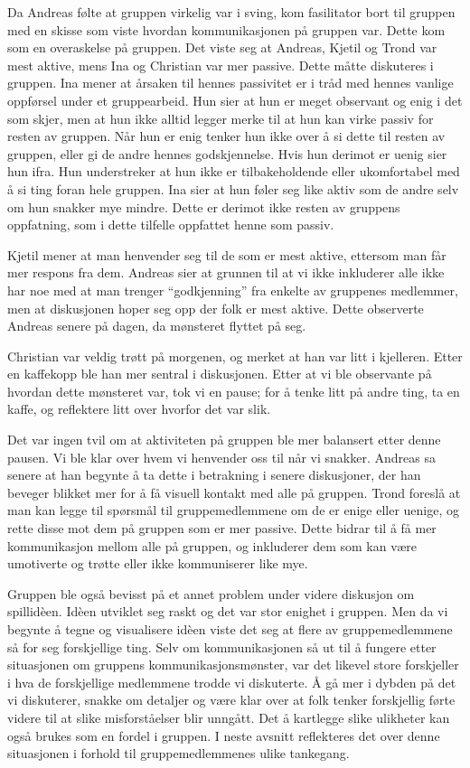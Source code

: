Da Andreas følte at gruppen virkelig var i sving, kom fasilitator bort
til gruppen med en skisse som viste hvordan kommunikasjonen på gruppen
var.
Dette kom som en overaskelse på gruppen. Det viste seg at Andreas,
Kjetil og Trond var mest aktive, mens Ina og Christian var mer passive.
Dette måtte diskuteres i gruppen.  Ina mener at årsaken til hennes
passivitet er i tråd med hennes vanlige oppførsel under et gruppearbeid.
Hun sier at hun er meget observant og enig i det som skjer, men at hun
ikke alltid legger merke til at hun kan virke passiv for resten av
gruppen. Når hun er enig tenker hun ikke over å si dette til resten av
gruppen, eller gi de andre hennes godskjennelse. Hvis hun derimot er
uenig sier hun ifra. Hun understreker at hun ikke er tilbakeholdende
eller ukomfortabel med å si ting foran hele gruppen. Ina sier at hun
føler seg like aktiv som de andre selv om hun snakker mye mindre. Dette
er derimot ikke resten av gruppens oppfatning, som i dette tilfelle
oppfattet henne som passiv. 

Kjetil mener at man henvender seg til de som er mest aktive, ettersom
man får mer respons fra dem. Andreas sier at grunnen til at vi ikke
inkluderer alle ikke har noe med at man trenger “godkjenning” fra
enkelte av gruppenes medlemmer, men at diskusjonen hoper seg opp der
folk er mest aktive. Dette observerte Andreas senere på dagen, da
mønsteret flyttet på seg. 

Christian var veldig trøtt på morgenen, og merket at han var litt i
kjelleren. Etter en kaffekopp ble han mer sentral i diskusjonen. Etter
at vi ble observante på hvordan dette mønsteret var, tok vi en pause;
for å tenke litt på andre ting, ta en kaffe, og reflektere litt over
hvorfor det var slik. 

Det var ingen tvil om at aktiviteten på gruppen ble mer balansert etter
denne pausen. Vi ble klar over hvem vi henvender oss til når vi snakker.
Andreas sa senere at han begynte å ta dette i betrakning i senere
diskusjoner, der han beveger blikket mer for å få visuell kontakt med
alle på gruppen. Trond foreslå at man kan legge til spørsmål til
gruppemedlemmene om de er enige eller uenige, og rette disse mot dem på
gruppen som er mer passive. Dette bidrar til å få mer kommunikasjon
mellom alle på gruppen, og inkluderer dem som kan være umotiverte og
trøtte eller ikke kommuniserer like mye. 

Gruppen ble også bevisst på et annet problem under videre diskusjon om
spillidèen. Idèen utviklet seg raskt og det var stor enighet i gruppen.
Men da vi begynte å tegne og visualisere idèen viste det seg at flere av
gruppemedlemmene så for seg forskjellige ting. Selv om kommunikasjonen
så ut til å fungere etter situasjonen om gruppens kommunikasjonsmønster,
var det likevel store forskjeller i hva de forskjellige medlemmene
trodde vi diskuterte. Å gå mer i dybden på det vi diskuterer, snakke om
detaljer og være klar over at folk tenker forskjellig førte videre til
at slike misforståelser blir unngått. Det å kartlegge slike ulikheter
kan også brukes som en fordel i gruppen. I neste avsnitt reflekteres det
over denne situasjonen i forhold til gruppemedlemmenes ulike tankegang.

